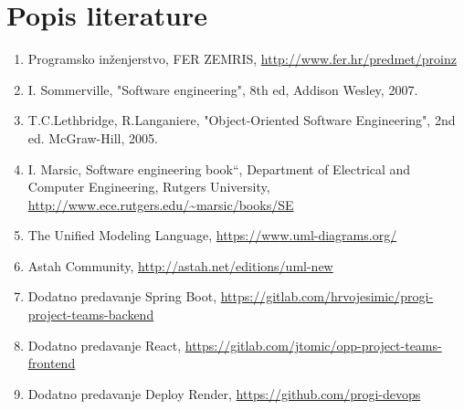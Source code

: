 \chapter*{Popis literature}

		\begin{enumerate}

			\item  Programsko inženjerstvo, FER ZEMRIS, \url{http://www.fer.hr/predmet/proinz}

			\item  I. Sommerville, "Software engineering", 8th ed, Addison Wesley, 2007.

			\item  T.C.Lethbridge, R.Langaniere, "Object-Oriented Software Engineering", 2nd ed. McGraw-Hill, 2005.

			\item  I. Marsic, Software engineering book``, Department of Electrical and Computer Engineering, Rutgers University, \url{http://www.ece.rutgers.edu/~marsic/books/SE}

			\item  The Unified Modeling Language, \url{https://www.uml-diagrams.org/}

			\item  Astah Community, \url{http://astah.net/editions/uml-new}

			\item  Dodatno predavanje Spring Boot, \url{https://gitlab.com/hrvojesimic/progi-project-teams-backend}

			\item  Dodatno predavanje React, \url{https://gitlab.com/jtomic/opp-project-teams-frontend}

			\item  Dodatno predavanje Deploy Render, \url{https://github.com/progi-devops}

		\end{enumerate}

